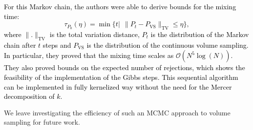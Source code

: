 \documentclass[twoside,11pt]{book}
\newcommand{\rev}[1]{\textcolor{black}{#1}}
\newtheorem{theorem}{Theorem}
\numberwithin{theorem}{chapter}
\numberwithin{definition}{chapter}
\numberwithin{proposition}{chapter}
\numberwithin{corollary}{chapter}
\numberwithin{example}{chapter}
\numberwithin{lemma}{chapter}
\numberwithin{assumption}{chapter}
\numberwithin{equation}{chapter}
\numberwithin{figure}{chapter}
\DeclareMathOperator{\Det}{Det}
\DeclareMathOperator{\VS}{\mathrm{VS}}
\newcommand{\pc}[1]{\textcolor{blue}{#1}}
\begin{document}
\rev{For this Markov chain, the authors were able to derive bounds for the mixing time:
$$\tau_{P_{0}}(\eta) = \min \{t |\:\: \|P_{t} - P_{\mathrm{VS}}\|_{\mathrm{TV}} \leq \eta \},$$ where $\|.\|_{\mathrm{TV}}$ is the total variation distance, $P_{t}$ is the distribution of the Markov chain after $t$ steps and $P_{\mathrm{VS}}$ is the distribution of the continuous volume sampling. }
\rev{In particular, they proved that the mixing time scales as $\mathcal{O}(N^{5}\log(N))$.
They also proved bounds on the expected number of rejections, which shows the feasibility of the implementation of the Gibbs steps.
  This sequential algorithm can be implemented in fully kernelized way without the need for the Mercer decomposition of $k$.}





We leave investigating the efficiency of such an MCMC approach to volume sampling for future work.
\end{document}
